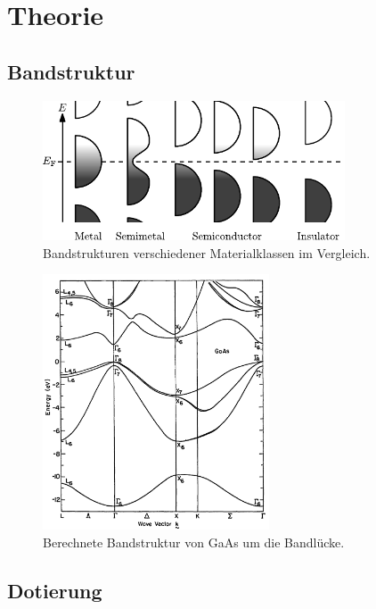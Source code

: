 \section[Theorie]{Theorie \textnormal{\cite{faraday}}}
\label{sec:theorie}

\subsection{Bandstruktur}

\begin{figure}
    \centering
    \includegraphics[width=0.8\textwidth]{content/grafik/bandstructure.pdf}
    \caption{Bandstrukturen verschiedener Materialklassen im Vergleich. \cite{wiki_band}}
    \label{fig:baender}
\end{figure}

\begin{figure}
    \centering
    \includegraphics[width=0.6\textwidth]{content/grafik/bandstruktur.jpg}
    \caption{Berechnete Bandstruktur von GaAs um die Bandlücke. \cite{coh_jam_el}}
    \label{fig:band}
    \hfill
\end{figure}

\subsection{Dotierung}

